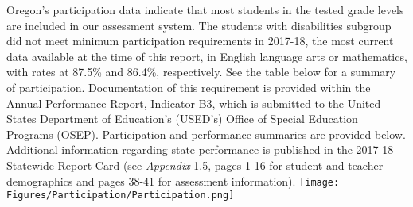 \documentclass[]{article}
\begin{document}
Oregon's participation data indicate that most students in the tested
grade levels are included in our assessment system. The students with
disabilities subgroup did not meet minimum participation requirements in
2017-18, the most current data available at the time of this report, in
English language arts or mathematics, with rates at 87.5\% and 86.4\%,
respectively. See the table below for a summary of participation.
Documentation of this requirement is provided within the Annual
Performance Report, Indicator B3, which is submitted to the United
States Department of Education's (USED's) Office of Special Education
Programs (OSEP). Participation and performance summaries are provided
below. Additional information regarding state performance is published
in the 2017-18
\color{link}\href{https://www.oregon.gov/ode/schools-and-districts/reportcards/Documents/rptcard2018.pdf}{Statewide
Report Card} \color{black} (see \emph{Appendix} 1.5, pages 1-16 for
student and teacher demographics and pages 38-41 for assessment
information).\FloatBarrier
\texttt{[image: Figures/Participation/Participation.png]}
\end{document}
